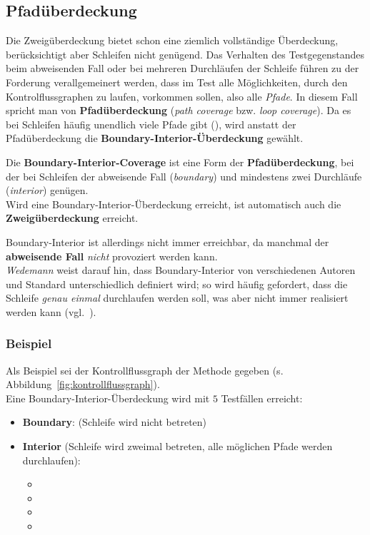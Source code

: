 \subsection{Pfadüberdeckung}
Die Zweigüberdeckung bietet schon eine ziemlich vollständige Überdeckung, berücksichtigt aber Schleifen nicht genügend.
Das Verhalten des Testgegenstandes beim abweisenden Fall oder bei mehreren Durchläufen der Schleife führen zu der Forderung verallgemeinert werden, dass im Test alle Möglichkeiten, durch den Kontrolflussgraphen zu laufen, vorkommen sollen, also alle \textit{Pfade}.
In diesem Fall spricht man von \textbf{Pfadüberdeckung} (\textit{path coverage} bzw. \textit{loop coverage}).
Da es bei Schleifen häufig unendlich viele Pfade gibt (\cite[52]{Wed09c}), wird anstatt der Pfadüberdeckung die \textbf{Boundary-Interior-Überdeckung} gewählt.

\begin{tcolorbox}[title=Boundary-Interior-Coverage]
    Die \textbf{Boundary-Interior-Coverage} ist eine Form der \textbf{Pfadüberdeckung}, bei der bei Schleifen der abweisende Fall (\textit{boundary}) und mindestens zwei Durchläufe (\textit{interior}) genügen.\\
    Wird eine Boundary-Interior-Überdeckung erreicht, ist automatisch auch die \textbf{Zweigüberdeckung} erreicht.
\end{tcolorbox}

\noindent
Boundary-Interior ist allerdings nicht immer erreichbar, da manchmal der \textbf{abweisende Fall} \textit{nicht} provoziert werden kann.\\
\textit{Wedemann} weist darauf hin, dass Boundary-Interior von verschiedenen Autoren und Standard unterschiedlich definiert wird; so wird häufig gefordert, dass die Schleife \textit{genau einmal} durchlaufen werden soll, was aber nicht immer realisiert werden kann (vgl.~\cite[52]{Wed09c}).

\subsubsection*{Beispiel}
Als Beispiel sei der Kontrollflussgraph der Methode  gegeben (s. Abbildung~\ref{fig:kontrollflussgraph}).\\
Eine Boundary-Interior-Überdeckung wird mit $5$ Testfällen erreicht:

\begin{itemize}
    \item \textbf{Boundary}:  (Schleife wird nicht betreten)
    \item \textbf{Interior} (Schleife wird zweimal betreten, alle möglichen Pfade werden durchlaufen):
    \begin{itemize}
        \item {}
        \item {}
        \item {}
        \item {}
    \end{itemize}
\end{itemize}

